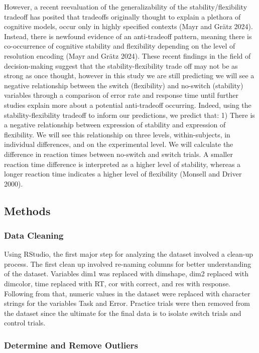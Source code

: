 \documentclass[
  11pt,
]{article}
\begin{document}
However, a recent reevaluation of the generalizability of the
stability/flexibility tradeoff has posited that tradeoffs originally
thought to explain a plethora of cognitive models, occur only in highly
specified contexts (Mayr and Grätz 2024). Instead, there is newfound
evidence of an anti-tradeoff pattern, meaning there is co-occurrence of
cognitive stability and flexibility depending on the level of resolution
encoding (Mayr and Grätz 2024). These recent findings in the field of
decision-making suggest that the stability-flexibility trade off may not
be as strong as once thought, however in this study we are still
predicting we will see a negative relationship between the switch
(flexibility) and no-switch (stability) variables through a comparison
of error rate and response time until further studies explain more about
a potential anti-tradeoff occurring. Indeed, using the
stability-flexibility tradeoff to inform our predictions, we predict
that: 1) There is a negative relationship between expression of
stability and expression of flexibility. We will see this relationship
on three levels, within-subjects, in individual differences, and on the
experimental level. We will calculate the difference in reaction times
between no-switch and switch trials. A smaller reaction time difference
is interpreted as a higher level of stability, whereas a longer reaction
time indicates a higher level of flexibility (Monsell and Driver 2000).

\subsection{Methods}\label{methods}

\subsubsection{Data Cleaning}\label{data-cleaning}

Using RStudio, the first major step for analyzing the dataset involved a
clean-up process. The first clean up involved re-naming columns for
better understanding of the dataset. Variables dim1 was replaced with
dimshape, dim2 replaced with dimcolor, time replaced with RT, cor with
correct, and res with response. Following from that, numeric values in
the dataset were replaced with character strings for the variables Task
and Error. Practice trials were then removed from the dataset since the
ultimate for the final data is to isolate switch trials and control
trials.

\subsubsection{Determine and Remove
Outliers}\label{determine-and-remove-outliers}
\end{document}
